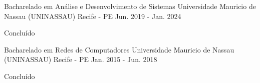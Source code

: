 

\begin{cventries}

  \cventry
    {Bacharelado em Análise e Desenvolvimento de Sistemas} %
    {Universidade Mauricio de Nassau (UNINASSAU)} %
    {Recife - PE} %
    {Jun. 2019 - Jan. 2024} %
    {
      \begin{cvitems} %
        \item{Concluído}
      \end{cvitems}
    }

  \cventry
    {Bacharelado em Redes de Computadores} %
    {Universidade Mauricio de Nassau (UNINASSAU)} %
    {Recife - PE} %
    {Jan. 2015 - Jun. 2018} %
    {
      \begin{cvitems} %
        \item{Concluído}
      \end{cvitems}
    }

\end{cventries}
